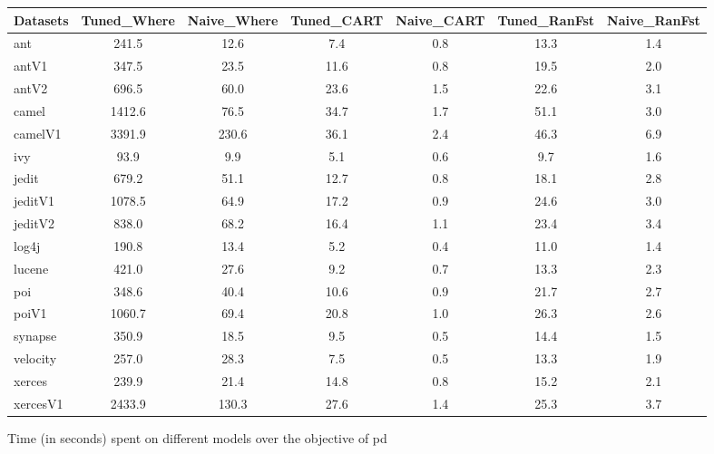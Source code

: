 \documentclass{sig-alternative}
\begin{document}
\clearpage
\begin{figure}[!ht]
\scriptsize
\centering
  \begin{tabular}{l|c |c |c |c |c |c }
    \hline\hline
    Datasets & Tuned\_Where & Naive\_Where & Tuned\_CART & Naive\_CART & Tuned\_RanFst & Naive\_RanFst\\
    \hline
    ant & 241.5 & 12.6 & 7.4 & 0.8 & 13.3 & 1.4\\
    antV1 & 347.5 & 23.5 & 11.6 & 0.8 & 19.5 & 2.0\\
    antV2 & 696.5 & 60.0 & 23.6 & 1.5 & 22.6 & 3.1\\
    camel & 1412.6 & 76.5 & 34.7 & 1.7 & 51.1 & 3.0\\
    camelV1 & 3391.9 & 230.6 & 36.1 & 2.4 & 46.3 & 6.9\\
    ivy & 93.9 & 9.9 & 5.1 & 0.6 & 9.7 & 1.6\\
    jedit & 679.2 & 51.1 & 12.7 & 0.8 & 18.1 & 2.8\\
    jeditV1 & 1078.5 & 64.9 & 17.2 & 0.9 & 24.6 & 3.0\\
    jeditV2 & 838.0 & 68.2 & 16.4 & 1.1 & 23.4 & 3.4\\
    log4j & 190.8 & 13.4 & 5.2 & 0.4 & 11.0 & 1.4\\
    lucene & 421.0 & 27.6 & 9.2 & 0.7 & 13.3 & 2.3\\
    poi & 348.6 & 40.4 & 10.6 & 0.9 & 21.7 & 2.7\\
    poiV1 & 1060.7 & 69.4 & 20.8 & 1.0 & 26.3 & 2.6\\
    synapse & 350.9 & 18.5 & 9.5 & 0.5 & 14.4 & 1.5\\
    velocity & 257.0 & 28.3 & 7.5 & 0.5 & 13.3 & 1.9\\
    xerces & 239.9 & 21.4 & 14.8 & 0.8 & 15.2 & 2.1\\
    xercesV1 & 2433.9 & 130.3 & 27.6 & 1.4 & 25.3 & 3.7\\
  \end{tabular}
  \caption{Time (in seconds) spent on different models over the objective of pd}
\end{figure}
\end{document}

